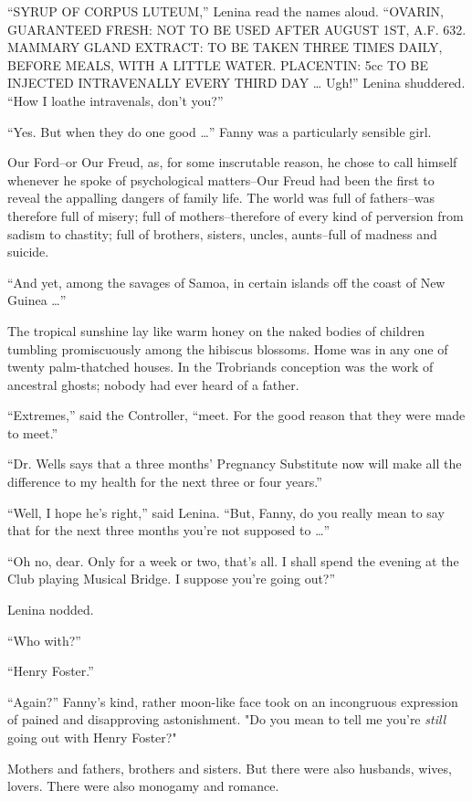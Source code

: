 \documentclass[12pt]{report}
\begin{document}
``{\selectfont SYRUP OF CORPUS LUTEUM,}'' Lenina read the names aloud. ``{\selectfont OVARIN,
GUARANTEED FRESH: NOT TO BE USED AFTER AUGUST 1ST, A.F. 632. MAMMARY
GLAND EXTRACT: TO BE TAKEN THREE TIMES DAILY, BEFORE MEALS, WITH A
LITTLE WATER. PLACENTIN: 5cc TO BE INJECTED INTRAVENALLY EVERY THIRD DAY
\ldots{}} Ugh!'' Lenina shuddered. ``How I loathe intravenals, don't
you?''

``Yes. But when they do one good \ldots{}'' Fanny was a particularly
sensible girl.

Our Ford--or Our Freud, as, for some inscrutable reason, he chose to
call himself whenever he spoke of psychological matters--Our Freud had
been the first to reveal the appalling dangers of family life. The world
was full of fathers--was therefore full of misery; full of
mothers--therefore of every kind of perversion from sadism to chastity;
full of brothers, sisters, uncles, aunts--full of madness and suicide.

``And yet, among the savages of Samoa, in certain islands off the coast
of New Guinea \ldots{}''

The tropical sunshine lay like warm honey on the naked bodies of
children tumbling promiscuously among the hibiscus blossoms. Home was in
any one of twenty palm-thatched houses. In the Trobriands conception was
the work of ancestral ghosts; nobody had ever heard of a father.

``Extremes,'' said the Controller, ``meet. For the good reason that they
were made to meet.''

``Dr. Wells says that a three months' Pregnancy Substitute now will make
all the difference to my health for the next three or four years.''

``Well, I hope he's right,'' said Lenina. ``But, Fanny, do you really
mean to say that for the next three months you're not supposed to
\ldots{}''

``Oh no, dear. Only for a week or two, that's all. I shall spend the
evening at the Club playing Musical Bridge. I suppose you're going
out?''

Lenina nodded.

``Who with?''

``Henry Foster.''

``Again?'' Fanny's kind, rather moon-like face took on an incongruous
expression of pained and disapproving astonishment. "Do you mean to tell
me you're \emph{still} going out with Henry Foster?"

Mothers and fathers, brothers and sisters. But there were also husbands,
wives, lovers. There were also monogamy and romance.
\end{document}
